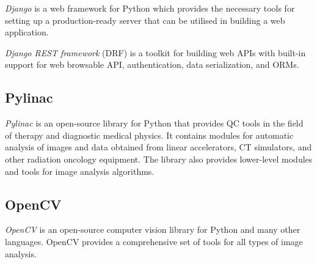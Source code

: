 \emph{Django} is a web framework for Python which provides the necessary tools for setting up a production-ready server that can be utilised in building a web application. \cite{django}

\emph{Django REST framework} (DRF) is a toolkit for building web APIs with built-in support for web browsable API, authentication, data serialization, and ORMs. \cite{drf}

\subsection{Pylinac}

\emph{Pylinac} is an open-source library for Python that provides QC tools in the field of therapy and diagnostic medical physics. It contains modules for automatic analysis of images and data obtained from linear accelerators, CT simulators, and other radiation oncology equipment. The library also provides lower-level modules and tools for image analysis algorithms. \cite{pylinac}

\subsection{OpenCV}

\emph{OpenCV} is an open-source computer vision library for Python and many other languages. OpenCV provides a comprehensive set of tools for all types of image analysis. \cite{openCV}